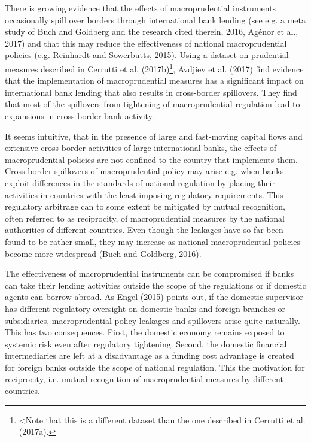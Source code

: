 \documentclass[12pt,a4paper]{article}
\begin{document}
There is growing evidence that the effects of macroprudential instruments occasionally spill over borders through international bank lending (see e.g. a meta study of Buch and Goldberg and the research cited therein, 2016, Agénor et al., 2017) and that this may reduce the effectiveness of national macroprudential policies (e.g. Reinhardt and Sowerbutts, 2015). Using a dataset on prudential measures described in Cerrutti et al. (2017b)\footnote{<Note that this is a different dataset than the one described in Cerrutti et al. (2017a).}, Avdjiev et al. (2017) find evidence that the implementation of macroprudential measures has a significant impact on international bank lending that also results in cross-border spillovers. They find that most of the spillovers from tightening of macroprudential regulation lead to expansions in cross-border bank activity.

It seems intuitive, that in the presence of large and fast-moving capital flows and extensive cross-border activities of large international banks, the effects of macroprudential policies are not confined to the country that implements them. Cross-border spillovers of macroprudential policy may arise e.g. when banks exploit differences in the standards of national regulation by placing their activities in countries with the least imposing regulatory requirements. This regulatory arbitrage can to some extent be mitigated by mutual recognition, often referred to as reciprocity, of macroprudential measures by the national authorities of different countries. Even though the leakages have so far been found to be rather small, they may increase as national macroprudential policies become more widespread (Buch and Goldberg, 2016). 

The effectiveness of macroprudential instruments can be compromised if banks can take their lending activities outside the scope of the regulations or if domestic agents can borrow abroad. As Engel (2015) points out, if the domestic supervisor has different regulatory oversight on domestic banks and foreign branches or subsidiaries, macroprudential policy leakages and spillovers arise quite naturally. This has two consequences. First, the domestic economy remains exposed to systemic risk even after regulatory tightening. Second, the domestic financial intermediaries are left at a disadvantage as a funding cost advantage is created for foreign banks outside the scope of national regulation. This the motivation for reciprocity, i.e. mutual recognition of macroprudential measures by different countries.
\end{document}
